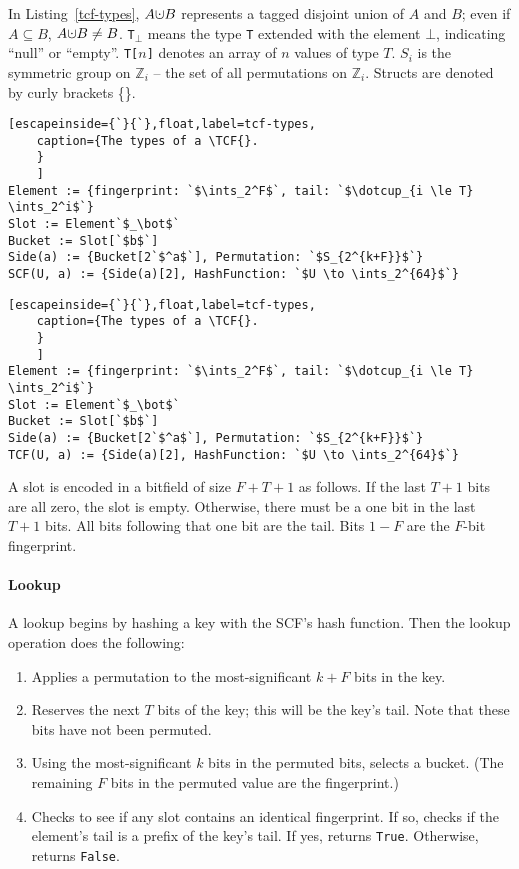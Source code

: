 \documentclass[letterpaper,twocolumn,10pt]{article}
\newcommand{\ints}{\mathbb{Z}}
\newcommand{\dotcup}{\ensuremath{\mathaccent\cdot\cup}}
\newcommand{\TCF}{SCF}
\newcommand{\TCF}{TCF}
\begin{document}
In Listing~\ref{tcf-types},       $A \dotcup B$ represents a tagged disjoint union of $A$ and $B$; even if $A \subseteq B$, $A \dotcup B \ne B$.
      \texttt{T}$_\bot$ means the type \texttt{T} extended with the element $\bot$, indicating ``null'' or ``empty''.
      \texttt{T[$n$]} denotes an array of $n$ values of type $T$.
      $S_i$ is the symmetric group on $\ints_i$ -- the set of all permutations on $\ints_i$.
      Structs are denoted by curly brackets \{\}. %

\ifanon
\begin{lstlisting}[escapeinside={`}{`},float,label=tcf-types,
    caption={The types of a \TCF{}.
    }
    ]
Element := {fingerprint: `$\ints_2^F$`, tail: `$\dotcup_{i \le T} \ints_2^i$`}
Slot := Element`$_\bot$`
Bucket := Slot[`$b$`]
Side(a) := {Bucket[2`$^a$`], Permutation: `$S_{2^{k+F}}$`}
SCF(U, a) := {Side(a)[2], HashFunction: `$U \to \ints_2^{64}$`}
\end{lstlisting}
\else
\begin{lstlisting}[escapeinside={`}{`},float,label=tcf-types,
    caption={The types of a \TCF{}.
    }
    ]
Element := {fingerprint: `$\ints_2^F$`, tail: `$\dotcup_{i \le T} \ints_2^i$`}
Slot := Element`$_\bot$`
Bucket := Slot[`$b$`]
Side(a) := {Bucket[2`$^a$`], Permutation: `$S_{2^{k+F}}$`}
TCF(U, a) := {Side(a)[2], HashFunction: `$U \to \ints_2^{64}$`}
\end{lstlisting}
\fi

A slot is encoded in a bitfield of size $F+T+1$ as follows.
If the last $T+1$ bits are all zero, the slot is empty.
Otherwise, there must be a one bit in the last $T+1$ bits.
All bits following that one bit are the tail.
Bits $1-F$ are the $F$-bit fingerprint.

\paragraph{Lookup}
A lookup begins by hashing a key with the \TCF{}'s hash function. %
Then the lookup operation does the following:

\begin{enumerate}
\item Applies a permutation to the most-significant $k + F$ bits in the key. %
\item Reserves the next $T$ bits of the key; this will be the key's tail.
Note that these bits have not been permuted.
\item Using the most-significant $k$ bits in the permuted bits, selects a bucket. %
(The remaining $F$ bits in the permuted value are the fingerprint.)
\item Checks to see if any slot contains an identical fingerprint. %
If so, checks if the element's tail is a prefix of the key's tail.
If yes, returns \verb|True|.
Otherwise, returns \verb|False|.
\end{enumerate}
\end{document}
